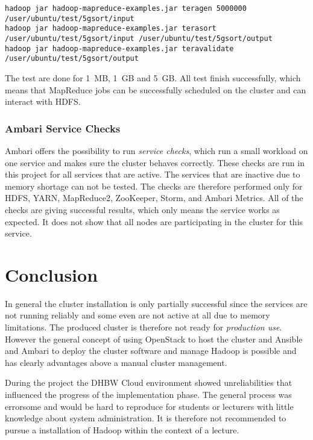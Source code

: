 \lstset{language=sh}
\begin{lstlisting}[caption={Running Terasort as a test for YARN and HDFS}, label={lst:terasort}]
hadoop jar hadoop-mapreduce-examples.jar teragen 5000000 /user/ubuntu/test/5gsort/input
hadoop jar hadoop-mapreduce-examples.jar terasort /user/ubuntu/test/5gsort/input /user/ubuntu/test/5gsort/output
hadoop jar hadoop-mapreduce-examples.jar teravalidate /user/ubuntu/test/5gsort/output
\end{lstlisting}

The test are done for 1~\ac{MB}, 1~\ac{GB} and 5~\ac{GB}.
All test finish successfully, which means that MapReduce jobs can be successfully scheduled on the cluster and can interact with \ac{HDFS}.

\subsubsection{Ambari Service Checks}

Ambari offers the possibility to run \emph{service checks}, which run a small workload on one service and makes sure the cluster behaves correctly.
These checks are run in this project for all services that are active.
The services that are inactive due to memory shortage can not be tested.
The checks are therefore performed  only for \ac{HDFS}, \ac{YARN}, MapReduce2, ZooKeeper, Storm, and Ambari Metrics. All of the checks are giving successful results, which only means the service works as expected. It does not show that all nodes are participating in the cluster for this service. 

\section{Conclusion}

In general the cluster installation is only partially successful since the services are not running reliably and some even are not active at all due to memory limitations.
The produced cluster is therefore not ready for \emph{production use}.
However the general concept of using OpenStack to host the cluster and Ansible and Ambari to deploy the cluster software and manage Hadoop is possible and has clearly advantages above a manual cluster management.

During the project the \ac{DHBW} Cloud environment showed unreliabilities that influenced the progress of the implementation phase.
The general process was errorsome and would be hard to reproduce for students or lecturers with little knowledge about system administration. It is therefore not recommended to pursue a installation of Hadoop within the context of a lecture. 

